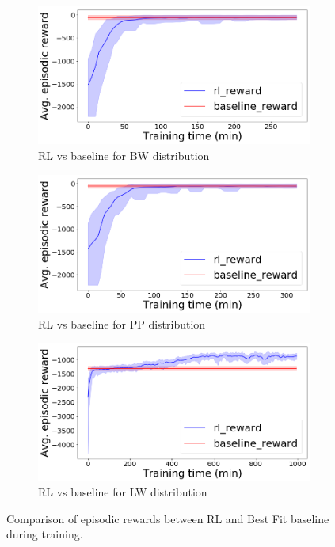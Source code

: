 \begin{figure}
	\centering
	\begin{subfigure}[b]{0.33\textwidth}
		\centering
		\includegraphics[width=\textwidth]{images/bin_packing_rl_vs_baseline_bounded_waste_binsize_100.png}
		\caption{RL vs baseline for BW distribution}
		\label{fig:bin_packing_BW_dist1}
	\end{subfigure}
	\hfill
	\begin{subfigure}[b]{0.33\textwidth}
		\centering
		\includegraphics[width=\textwidth]{images/bin_packing_rl_vs_baseline_perfect_pack_binsize_100.png}
		\caption{RL vs baseline for PP distribution}
		\label{fig:bin_packing_PP_dist1}
	\end{subfigure}
	\hfill
	\begin{subfigure}[b]{0.33\textwidth}
		\centering
		\includegraphics[width=\textwidth]{images/bin_packing_rl_vs_baseline_linear_waste_binsize_100.png}
		\caption{RL vs baseline for LW distribution}
		\label{fig:bin_packing_LW_dist1}
	\end{subfigure}
	\caption{Comparison of episodic rewards between RL and Best Fit baseline during training.}
	\label{fig:RLvsBF_binpacking}
		\vspace{-1em}
\end{figure}


